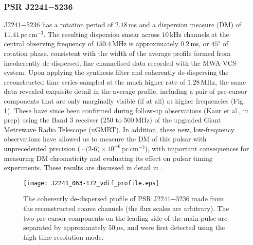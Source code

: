 \documentclass{pasa}%
\newcommand{\psrkaurJ}{J2241$-$5236}
\newcommand{\dmunits}{\ensuremath{\text{pc}\,\text{cm}^{-3}}}
\begin{document}
\subsubsection{PSR \psrkaurJ{}}

\psrkaurJ{} has a rotation period of $2.18\,$ms and a dispersion measure (DM) of $11.41\,\dmunits$.
The resulting dispersion smear across $10\,$kHz channels at the central observing frequency of $150.4\,$MHz is approximately $0.2\,$ms, or $45^\circ$ of rotation phase, consistent with the width of the average profile formed from incoherently de-dispersed, fine channelised data recorded with the MWA-VCS system.
Upon applying the synthesis filter and coherently de-dispersing the reconstructed time series sampled at the much higher rate of $1.28\,$MHz, the same data revealed exquisite detail in the average profile, including a pair of pre-cursor components that are only marginally visible (if at all) at higher frequencies (Fig. \ref{fig:J2241_profiles}).
These have since been confirmed during follow-up observations (Kaur et al., in prep) using the Band 3 receiver ($250$ to $500\,$MHz) of the upgraded Giant Metrewave Radio Telescope (uGMRT).
In addition, these new, low-frequency observations have allowed us to measure the DM of this pulsar with unprecedented precision ($\sim (2$-$6) \times 10^{-6}\,\dmunits$), with important consequences for measuring DM chromaticity and evaluating its effect on pulsar timing experiments.
These results are discussed in detail in \citet{Kaur2019}.


\begin{figure}[t!]
    \centering
    \texttt{[image: J2241\_063-172\_vdif\_profile.eps]}
    \caption{The coherently de-dispersed profile of PSR \psrkaurJ{} made from the reconstructed coarse channels \citep{Kaur2019} (the flux scales are arbitrary). The two pre-cursor components on the leading side of the main pulse are separated by approximately $50\,\mu$s, and were first detected using the high time resolution mode.}
    \label{fig:J2241_profiles}
\end{figure}
\end{document}
